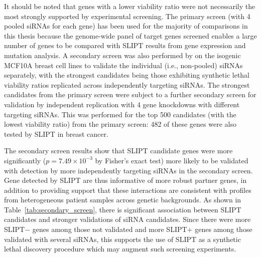 It should be noted that genes with a lower viability ratio were not necessarily the most strongly supported by experimental screening. The primary screen (with 4 pooled \glspl{siRNA} for each gene) has been used for the majority of comparisons in this thesis because the \gls{genome}-wide panel of target genes screened enables a large number of genes to be compared with \gls{SLIPT} results from \gls{gene expression} and  \gls{mutation} analysis. A secondary screen was also performed by \citet{Telford2015} on the isogenic MCF10A breast cell lines to validate the individual (i.e., non-pooled) \glspl{siRNA} separately, with the strongest candidates being those exhibiting \gls{synthetic lethal} viability ratios replicated across independently targeting \glspl{siRNA}. The strongest candidates from the primary screen were subject to a further secondary screen for validation by independent replication with 4 gene knockdowns with different targeting \glspl{siRNA}. This was performed for the top 500 candidates (with the lowest viability ratio) from the primary screen: 482 of these genes were also tested by \gls{SLIPT} in breast cancer.%

The secondary screen results show that \gls{SLIPT} candidate genes were more significantly ($p=7.49 \times 10^{-3}$ by Fisher's exact test) more  likely to be validated with detection by more independently targeting \glspl{siRNA} in the secondary screen. Gene detected by \gls{SLIPT} are thus informative of more robust partner genes, in addition to providing support that these interactions are consistent with  profiles from heterogeneous patient samples across genetic backgrounds. As shown in Table~\ref{tab:secondary_screen}, there is significant %
association between \gls{SLIPT} candidates and stronger validations of \gls{siRNA} candidates. Since there were more SLIPT$-$ genes among those not validated and more SLIPT$+$ genes among those validated with several \glspl{siRNA}, this supports the use of SLIPT as a \gls{synthetic lethal} discovery procedure which may augment such screening experiments.

